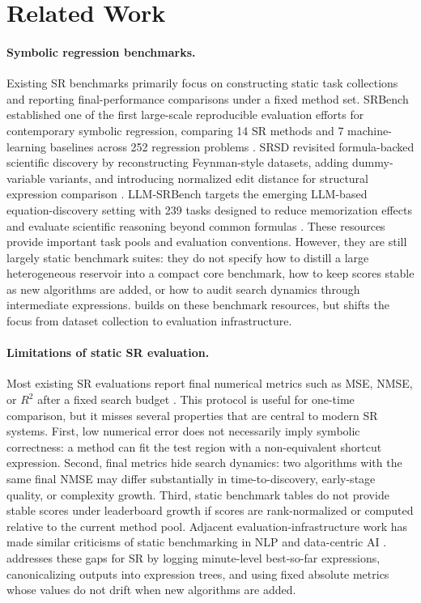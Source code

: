\section{Related Work}
\label{app:related-work}

\paragraph{Symbolic regression benchmarks.}
Existing SR benchmarks primarily focus on constructing static task collections and reporting final-performance comparisons under a fixed method set. SRBench established one of the first large-scale reproducible evaluation efforts for contemporary symbolic regression, comparing 14 SR methods and 7 machine-learning baselines across 252 regression problems \citep{lacava2021contemporary}. SRSD revisited formula-backed scientific discovery by reconstructing Feynman-style datasets, adding dummy-variable variants, and introducing normalized edit distance for structural expression comparison \citep{matsubara2024rethinking}. LLM-SRBench targets the emerging LLM-based equation-discovery setting with 239 tasks designed to reduce memorization effects and evaluate scientific reasoning beyond common formulas \citep{shojaee2025llmsrbench}. These resources provide important task pools and evaluation conventions. However, they are still largely static benchmark suites: they do not specify how to distill a large heterogeneous reservoir into a compact core benchmark, how to keep scores stable as new algorithms are added, or how to audit search dynamics through intermediate expressions. \arena{} builds on these benchmark resources, but shifts the focus from dataset collection to evaluation infrastructure.

\paragraph{Limitations of static SR evaluation.}
Most existing SR evaluations report final numerical metrics such as MSE, NMSE, or $R^2$ after a fixed search budget \citep{lacava2021contemporary,matsubara2024rethinking,shojaee2025llmsrbench}. This protocol is useful for one-time comparison, but it misses several properties that are central to modern SR systems. First, low numerical error does not necessarily imply symbolic correctness: a method can fit the test region with a non-equivalent shortcut expression. Second, final metrics hide search dynamics: two algorithms with the same final NMSE may differ substantially in time-to-discovery, early-stage quality, or complexity growth. Third, static benchmark tables do not provide stable scores under leaderboard growth if scores are rank-normalized or computed relative to the current method pool. Adjacent evaluation-infrastructure work has made similar criticisms of static benchmarking in NLP and data-centric AI \citep{kiela2021dynabench,ma2021dynaboard,mazumder2023dataperf}. \arena{} addresses these gaps for SR by logging minute-level best-so-far expressions, canonicalizing outputs into expression trees, and using fixed absolute metrics whose values do not drift when new algorithms are added.

